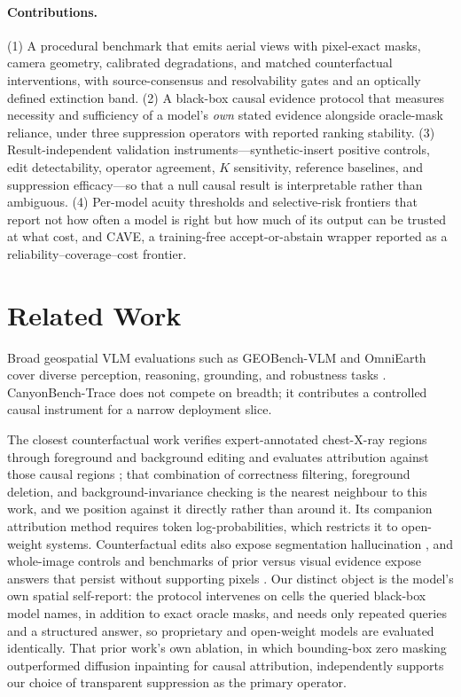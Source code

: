 \paragraph{Contributions.}
(1) A procedural benchmark that emits aerial views with pixel-exact masks,
camera geometry, calibrated degradations, and matched counterfactual
interventions, with source-consensus and resolvability gates and an optically
defined extinction band. (2) A black-box causal evidence protocol that measures
necessity and sufficiency of a model's \emph{own} stated evidence alongside
oracle-mask reliance, under three suppression operators with reported ranking
stability. (3) Result-independent validation instruments---synthetic-insert
positive controls, edit detectability, operator agreement, $K$ sensitivity,
reference baselines, and suppression efficacy---so that a null causal result is
interpretable rather than ambiguous. (4) Per-model acuity thresholds and
selective-risk frontiers that report not how often a model is right but how much
of its output can be trusted at what cost, and CAVE, a training-free
accept-or-abstain wrapper reported as a reliability--coverage--cost frontier.

\section{Related Work}
Broad geospatial VLM evaluations such as GEOBench-VLM and OmniEarth cover
diverse perception, reasoning, grounding, and robustness tasks
\cite{danish2025geobench,fu2026omniearth}. CanyonBench-Trace does not compete on
breadth; it contributes a controlled causal instrument for a narrow deployment
slice.

The closest counterfactual work verifies expert-annotated chest-X-ray regions
through foreground and background editing and evaluates attribution against those
causal regions \cite{xiong2026visual}; that combination of correctness filtering,
foreground deletion, and background-invariance checking is the nearest neighbour
to this work, and we position against it directly rather than around it. Its
companion attribution method requires token log-probabilities, which restricts it
to open-weight systems. Counterfactual edits also expose segmentation
hallucination \cite{li2025hallusegbench}, and whole-image controls and benchmarks
of prior versus visual evidence expose answers that persist without supporting
pixels \cite{zafar2026medical,sun2026prive}. Our distinct object is the model's
own spatial self-report: the protocol intervenes on cells the queried black-box
model names, in addition to exact oracle masks, and needs only repeated queries
and a structured answer, so proprietary and open-weight models are evaluated
identically. That prior work's own ablation, in which bounding-box zero masking
outperformed diffusion inpainting for causal attribution, independently supports
our choice of transparent suppression as the primary operator.

